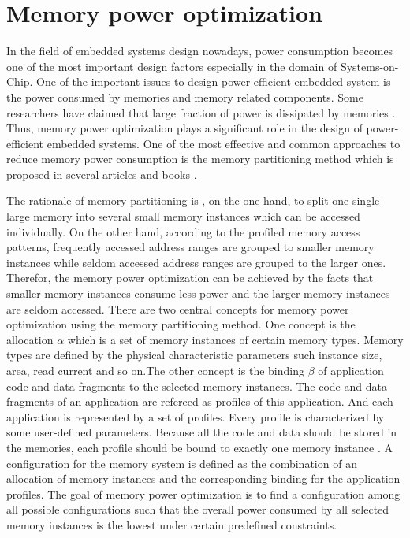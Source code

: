 \label{chap:introduction}
	\section{Memory power optimization}
	\label{sec:memory_power_optim}
	In the field of embedded systems design nowadays, power consumption
	becomes one of the most important design factors especially in the domain
	of Systems-on-Chip. One of the important issues to design power-efficient embedded
	system is the power consumed by memories and memory related components.
	Some researchers have claimed that large fraction of power is dissipated by
	memories \cite{Strobel2016, 876761, 4415607}. Thus, memory power optimization plays 
	a significant role in the design of power-efficient embedded systems. One of the most 
	effective and common approaches to reduce memory power consumption is the memory 
	partitioning method which is proposed in several articles and books
	\cite[p.43]{Strobel2016, 876761, 4415607, Hiser:2005:EAP:1088093, macii2002memory}.

	The rationale of memory partitioning is , on the one hand, to split one single large memory into 
	several small memory instances which can be accessed individually. On the other hand, according 
	to the profiled memory access patterns, frequently accessed address ranges are 
	grouped to smaller memory instances while seldom accessed address ranges are grouped 
	to the larger ones. Therefor, the memory power optimization can be achieved by the facts 
	that smaller memory instances consume less power and the larger memory instances are 
	seldom accessed.
	There are two central concepts for memory power optimization using the memory partitioning method.
	One concept is the allocation $ \alpha $ which is a set of memory instances of certain memory types. Memory
	types are defined by the physical characteristic parameters such instance size, area, read current
	and so on.The other concept is the binding $ \beta $ of application code and data fragments to the 
	selected memory instances. The code and data fragments of an application are refereed as profiles
	of this application. And each application is represented by a set of profiles. Every profile is
	characterized by some user-defined parameters. Because all the code and data should be stored in
	the memories, each profile should be bound to exactly one memory instance \cite{Strobel2016}. 
	A configuration for the memory system is defined as the combination of an allocation of memory 
	instances and the corresponding binding for the application profiles. The goal of memory power 
	optimization is to find a configuration among all possible configurations such that the overall 
	power consumed by all selected memory instances is the lowest under certain predefined constraints.
	
